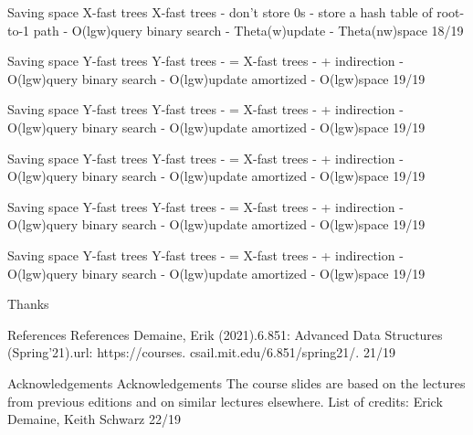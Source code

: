 \begin{description}[leftmargin=!,labelwidth=4.2em,style=nextline]
\item[Pag. 40] Saving space X-fast trees X-fast trees - don't store 0s - store a hash table of root-to-1 path - O(lgw)query binary search - Theta(w)update - Theta(nw)space 18/19
\item[Pag. 41] Saving space Y-fast trees Y-fast trees - = X-fast trees - + indirection - O(lgw)query binary search - O(lgw)update amortized - O(lgw)space 19/19
\item[Pag. 42] Saving space Y-fast trees Y-fast trees - = X-fast trees - + indirection - O(lgw)query binary search - O(lgw)update amortized - O(lgw)space 19/19
\item[Pag. 43] Saving space Y-fast trees Y-fast trees - = X-fast trees - + indirection - O(lgw)query binary search - O(lgw)update amortized - O(lgw)space 19/19
\item[Pag. 44] Saving space Y-fast trees Y-fast trees - = X-fast trees - + indirection - O(lgw)query binary search - O(lgw)update amortized - O(lgw)space 19/19
\item[Pag. 45] Saving space Y-fast trees Y-fast trees - = X-fast trees - + indirection - O(lgw)query binary search - O(lgw)update amortized - O(lgw)space 19/19
\item[Pag. 46] Thanks
\item[Pag. 47] References References Demaine, Erik (2021).6.851: Advanced Data Structures (Spring'21).url: https://courses. csail.mit.edu/6.851/spring21/. 21/19
\item[Pag. 48] Acknowledgements Acknowledgements The course slides are based on the lectures from previous editions and on similar lectures elsewhere. List of credits: Erick Demaine, Keith Schwarz 22/19
\end{description}
